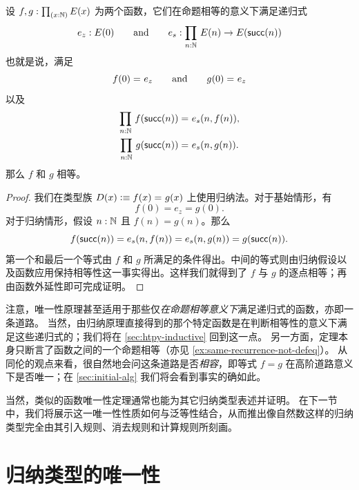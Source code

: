 \begin{thm}\label{thm:nat-uniq}
设 $f,g : \prd{x:\nat} E(x)$ 为两个函数，它们在命题相等的意义下满足递归式
%
\begin{equation*}
  e_z : E(0)
  \qquad\text{and}\qquad
  e_s : \prd{n : \nat} E(n) \to E(\suc(n))
\end{equation*}
%
也就是说，满足
\begin{equation*}
  f(0) =_{} e_z
  \qquad\text{and}\qquad
  g(0) =_{} e_z
\end{equation*}
以及
\begin{gather*}
  \prd{n : \nat} \id{f(\suc(n))}{e_s(n, f(n))},\\
  \prd{n : \nat} \id{g(\suc(n))}{e_s(n, g(n))}.
\end{gather*}
那么 $f$ 和 $g$ 相等。
\end{thm}

\begin{proof}
我们在类型族 $D(x) \vcentcolon\equiv f(x) =_{} g(x)$ 上使用归纳法。对于基始情形，有
\[ f(0) = e_z = g(0). \]
对于归纳情形，假设 $n : \mathbb{N}$ 且 $f(n) = g(n)$。那么
\[ f(\mathsf{succ}(n)) = e_s(n, f(n)) = e_s(n, g(n)) = g(\mathsf{succ}(n)). \]
第一个和最后一个等式由 $f$ 和 $g$ 所满足的条件得出。中间的等式则由归纳假设以及函数应用保持相等性这一事实得出。这样我们就得到了 $f$ 与 $g$ 的逐点相等；再由函数外延性即可完成证明。
\end{proof}

注意，唯一性原理甚至适用于那些仅\emph{在命题相等意义下}满足递归式的函数，亦即一条道路。
当然，由归纳原理直接得到的那个特定函数是在判断相等性的意义下满足这些递归式的；我们将在 \cref{sec:htpy-inductive} 回到这一点。
另一方面，定理本身只断言了函数之间的一个命题相等（亦见 \cref{ex:same-recurrence-not-defeq}）。
从同伦的观点来看，很自然地会问这条道路是否\emph{相容}，即等式 $f=g$ 在高阶道路意义下是否唯一；在 \cref{sec:initial-alg} 我们将会看到事实的确如此。

当然，类似的函数唯一性定理通常也能为其它归纳类型表述并证明。
在下一节中，我们将展示这一唯一性性质如何与泛等性结合，从而推出像自然数这样的归纳类型完全由其引入规则、消去规则和计算规则所刻画。

%
%


\section{归纳类型的唯一性}
\label{sec:appetizer-univalence}

